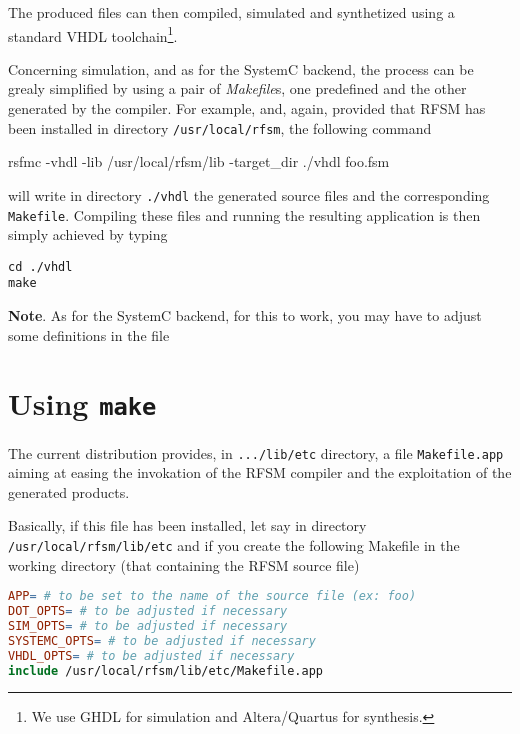 The produced files can then compiled, simulated and synthetized using a standard VHDL
toolchain\footnote{We use GHDL for simulation and Altera/Quartus for synthesis.}.

Concerning simulation, and as for the SystemC backend, the process can be grealy simplified by using
a pair of \emph{Makefile}s, one predefined and the other generated by the compiler.  For example,
and, again, provided that RFSM has been installed in directory \verb|/usr/local/rfsm|, the following
command

\begin{example}
rsfmc -vhdl -lib /usr/local/rfsm/lib -target_dir ./vhdl  foo.fsm  
\end{example}

will write in directory \verb|./vhdl| the generated source files and the corresponding
\verb|Makefile|. Compiling these files and running the resulting application is then simply achieved
by typing

\begin{verbatim}
cd ./vhdl
make 
\end{verbatim}

\medskip
\textbf{Note}. As for the SystemC backend, for this to work, you may have to adjust some definitions in the file

\section{Using \texttt{make}}
\label{sec:makefile}

The current distribution provides, in \verb|.../lib/etc| directory, a file \verb|Makefile.app|
aiming at easing the invokation of the RFSM compiler and the exploitation of the generated
products.

Basically, if this file has been installed, let say in directory \verb|/usr/local/rfsm/lib/etc|
and if you create the following Makefile in the working directory (that containing the RFSM source
file)

\begin{lstlisting}[language=make,frame=single]
APP= # to be set to the name of the source file (ex: foo)
DOT_OPTS= # to be adjusted if necessary
SIM_OPTS= # to be adjusted if necessary
SYSTEMC_OPTS= # to be adjusted if necessary
VHDL_OPTS= # to be adjusted if necessary
include /usr/local/rfsm/lib/etc/Makefile.app
\end{lstlisting}

